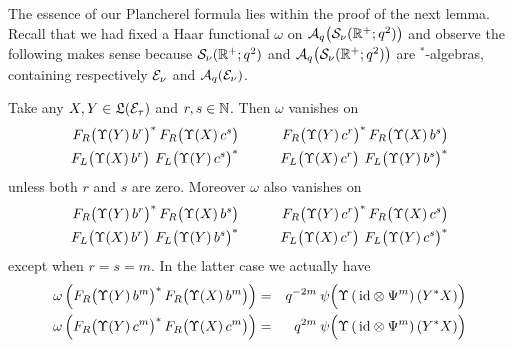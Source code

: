 \vspace{1ex}
The essence of our Plancherel formula lies within the proof of the next lemma.
Recall that we had fixed a Haar functional $\omega$ on
${\mathcal A}_q\!\left({\mathcal S}_\nu(\mathbb{R}^+;q^2)\right)$ and observe the following makes sense
because ${\mathcal S}_\nu(\mathbb{R}^+;q^2)$ and
$\Aq\!\left({\mathcal S}_\nu(\RR^+;q^2)\vertM \right)$
are $^*$-algebras, containing respectively $\mathcal E_\nu$ and ${\mathcal A}_q(\mathcal E_\nu)$.


\begin{lemma}
Take any $X,Y\in\mathfrak{L}(\mathcal E_\tau)$ and $r, s \in \mathbb{N}$. Then $\omega$ vanishes on
\begin{eqnarray*}
   F_R\!\left(\Upsilon(Y)\, b^r \vertM\right)^*
   F_R\!\left(\Upsilon(X)\, c^s \vertM\right)
& \hspace{2em}  &
   F_R\!\left(\Upsilon(Y)\, c^r \vertM\right)^*
   F_R\!\left(\Upsilon(X)\, b^s \vertM\right)
\\
   F_L\! \left(\Upsilon(X)\, b^r \vertM\right) \:
   F_L\! \left(\Upsilon(Y)\, c^s \vertM\right)^*
& &
   F_L\! \left(\Upsilon(X)\, c^r \vertM\right) \:
   F_L\! \left(\Upsilon(Y)\, b^s \vertM\right)^*
\end{eqnarray*}
unless both $r$ and $s$ are zero. Moreover $\omega$ also vanishes on
\begin{eqnarray*}
   F_R\!\left(\Upsilon(Y)\, b^r \vertM\right)^*
   F_R\!\left(\Upsilon(X)\, b^s \vertM\right)
& \hspace{2em}  &
   F_R\!\left(\Upsilon(Y)\, c^r \vertM\right)^*
   F_R\!\left(\Upsilon(X)\, c^s \vertM\right)
\\
   F_L\! \left(\Upsilon(X)\, b^r \vertM\right) \:
   F_L\! \left(\Upsilon(Y)\, b^s \vertM\right)^*
& &
   F_L\! \left(\Upsilon(X)\, c^r \vertM\right) \:
   F_L\! \left(\Upsilon(Y)\, c^s \vertM\right)^*
\end{eqnarray*}
except when $r=s=m$. In the latter case we actually have
\begin{eqnarray}
   \omega \left(\vertL  F_R\!\left(\Upsilon(Y)\, b^m \vertM\right)^*
                        F_R\!\left(\Upsilon(X)\, b^m \vertM\right)   \right)
&=&
   q^{-2m} \: \psi \! \left(\Upsilon\left(\,\id \tens \Psi^m \right)(Y^* X) \vertL\right)
\label{eq:pre_plancherel:essence:Rb} \\
   \omega \left(\vertL  F_R\!\left(\Upsilon(Y)\, c^m \vertM\right)^*
                        F_R\!\left(\Upsilon(X)\, c^m \vertM\right)   \right)
&=&
   q^{2m} \: \psi \! \left(\Upsilon\left(\,\id \tens \Psi^m \right)(Y^* X) \vertL\right)
\label{eq:pre_plancherel:essence:Rc} \\

\end{eqnarray}
\end{lemma}

